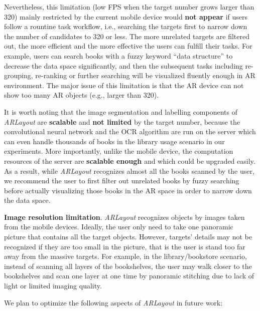 Nevertheless, this limitation (low FPS when the target number grows larger than 320)
mainly restricted by the current mobile device would \textbf{not appear} if users
follow a rountine task workflow, i.e.,
searching the targets first to narrow down the number of candidates to 320 or less.
The more unrelated targets are filtered out, the more efficient and the more effective
the users can fulfill their tasks.
For example, users can search books with a fuzzy keyword ``data structure''
to decrease the data space significantly,
and then the subsequent tasks including re-grouping, re-ranking or further searching
will be visualized fluently enough in AR environment.
The major issue of this limitation is that the AR device can not show
too many AR objects (e.g., larger than 320).

It is worth noting that the image segmentation and labelling components of \textit{ARLayout}
are \textbf{scalable} and \textbf{not limited} by the target number,
because the convolutional neural network and the OCR algorithm are run on the server
which can even handle thousands of books in the library usage scenario in our experiments.
More importantly, unlike the mobile device, the computation resources of the server are
\textbf{scalable enough} and which could be upgraded easily.
As a result, while \textit{ARLayout} recognizes almost all the books scanned by the user,
we recommend the user to first filter out unrelated books by fuzzy searching before actually
visualizing those books in the AR space in order to narrow down the data space.


\textbf{Image resolution limitation}. \textit{ARLayout} recognizes objects by images taken from the mobile devices.
Ideally, the user only need to take one panoramic picture that contains all the target objects.
However, targets' details may not be recognized if they are too small in the picture,
that is the user is stand too far away from the massive targets.
For example, in the library/bookstore scenario, instead of scanning all layers of the bookshelves,
the user may walk closer to the bookshelves and scan one layer at one time by panoramic stitching
due to lack of light or limited imaging quality.



We plan to optimize the following aspects of \textit{ARLayout} in future work:

